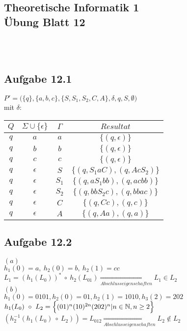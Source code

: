 \documentclass[11pt,a4paper]{article}
\begin{document}
\begin{center}
\section*{ Theoretische Informatik 1 \\ Übung Blatt 12}
\end{center}
\ \\ \ \\

\subsection*{Aufgabe 12.1}

$P' = \Big(\{q\}, \{a, b, c\}, \{S, S_1, S_2, C, A\}, \delta, q, S, \emptyset\Big)$ \\
mit $\delta$:
\begin{tabular}{c|c|c|c}
$Q$ & $\Sigma \cup \{\epsilon\}$ & $\Gamma$ & $Resultat$\\
\hline
$q$ & $a$ & $a$ & $\{(q, \epsilon)\}$\\
\hline
$q$ & $b$ & $b$ & $\{(q, \epsilon)\}$\\
\hline
$q$ & $c$ & $c$ & $\{(q, \epsilon)\}$\\
\hline
$q$ & $\epsilon$ & $S$ & $\{(q, S_1aC), (q, AcS_2)\}$\\
\hline
$q$ & $\epsilon$ & $S_1$ & $\{(q, aS_1bb), (q, acbb)\}$\\
\hline
$q$ & $\epsilon$ & $S_2$ & $\{(q, bbS_2c), (q, bbac)\}$\\
\hline
$q$ & $\epsilon$ & $C$ & $\{(q, Cc), (q,c)\}$\\
\hline
$q$ & $\epsilon$ & $A$ & $\{(q, Aa), (q, a)\}$\\
\end{tabular}

\subsection*{Aufgabe 12.2}
$(a)$\\
$h_1(0) = a, ~ h_2(0) = b, ~ h_2(1) = cc$\\
$L_1 = (h_1(L_0))^* ~ \circ ~ h_2(L_{01}) \underset{Abschlusseigenschaften} {\Rightarrow} L_1 \in \textit{L}_2$\\

$(b)$\\
$h_1(0) = 0101, h_2(0) = 01, h_2(1) = 1010, h_3(2) = 202$\\
$h_1(L_0) ~ \circ ~ L_2 = \Big {\{}(01)^n(10)^{2n}(202)^n | n \in \mathbb N, n \geq 2 \Big {\}}$ \\
$(h_2^{-1}(h_1(L_0) ~ \circ ~ L_2)) = L_{012} \underset{Abschlusseigenschaften} {\Rightarrow} L_2 \notin \textit{L}_2$\\
\end{document}
